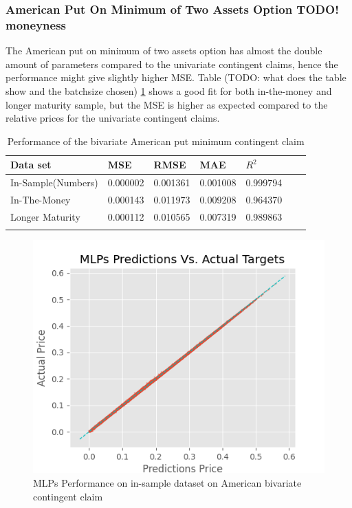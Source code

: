\subsubsection{American Put On Minimum of Two Assets Option TODO! moneyness}
The American put on minimum of two assets option has almost the double amount of parameters compared to the univariate contingent claims, hence the performance might give slightly higher MSE. Table (TODO: what does the table show and the batchsize chosen) \ref{tab:AmerMinPerformanceComparision} shows a good fit for both in-the-money and longer maturity sample, but the MSE is higher as expected compared to the relative prices for the univariate contingent claims. \\ 

\begin{table}[th]
\caption{Performance of the bivariate American put minimum contingent claim}
\label{tab:AmerMinPerformanceComparision}
\centering
\begin{tabular}{l l l l l l l }
\toprule
\textbf{Data set} & \textbf{MSE} & \textbf{RMSE} & \textbf{MAE} & \textbf{$R^2$} \\
\midrule
In-Sample(Numbers) & 0.000002 & 0.001361 & 0.001008 & 0.999794\\
In-The-Money & 0.000143 & 0.011973 & 0.009208 & 0.964370\\
Longer Maturity & 0.000112 & 0.010565 & 0.007319 & 0.989863\\
\bottomrule\\
\end{tabular}
\end{table}

\begin{figure}[th]
\centering
\includegraphics{Figures/inSampleAmerMinP.png}
\decoRule
\caption[MLPs Performance on in-sample dataset American put on minimum on two assets]{MLPs Performance on in-sample dataset on American bivariate contingent claim}
\label{fig:MLPsInSampleAmerMin}
\end{figure}

